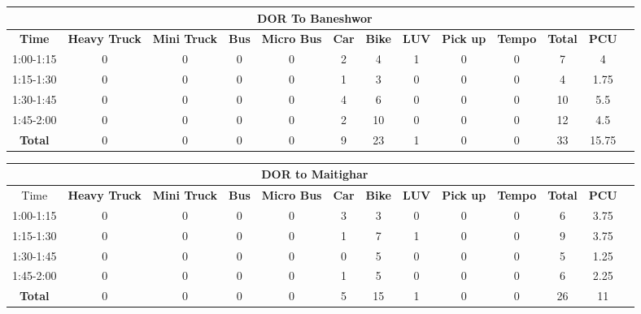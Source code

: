 \begin{landscape}
\centering
\begin{table}[h!]
\centering
\begin{tabular}{|c|c|c|c|c|c|c|c|c|c|c|c|c|}
    \hline
    \multicolumn{12}{|c|}{\textbf{DOR To Baneshwor}} \\
    \hline
    \textbf{Time} & \textbf{Heavy Truck} & \textbf{Mini Truck} & \textbf{Bus} & \textbf{Micro Bus} & \textbf{Car} & \textbf{Bike} & \textbf{LUV} & \textbf{Pick up} & \textbf{Tempo} & \textbf{\textbf{Total}} & \textbf{PCU} \\
    \hline
1:00-1:15	&0	&0	&0	&0	&2	&4	&1	&0	&0	&7	&4 \\ \hline
1:15-1:30	&0	&0	&0	&0	&1	&3	&0	&0	&0	&4	&1.75 \\ \hline
1:30-1:45	&0	&0	&0	&0	&4	&6	&0	&0	&0	&10	&5.5 \\ \hline
1:45-2:00	&0	&0	&0	&0	&2	&10	&0	&0	&0	&12	&4.5 \\ \hline
\textbf{Total}	&0	&0	&0	&0	&9	&23	&1	&0	&0	&33	&15.75 \\ \hline



\end{tabular}

\vspace{0.5cm}

\begin{tabular}{|c|c|c|c|c|c|c|c|c|c|c|c|c|}
    \hline
    \multicolumn{12}{|c|}{\textbf{DOR to Maitighar}} \\
    \hline
        Time & \textbf{Heavy Truck} & \textbf{Mini Truck} & \textbf{Bus} & \textbf{Micro Bus} & \textbf{Car} & \textbf{Bike} & \textbf{LUV} & \textbf{Pick up} & \textbf{Tempo} & \textbf{\textbf{Total}} & \textbf{PCU} \\
    \hline
1:00-1:15	&0	&0	&0	&0	&3	&3	&0	&0	&0	&6	&3.75 \\ \hline
1:15-1:30	&0	&0	&0	&0	&1	&7	&1	&0	&0	&9	&3.75 \\ \hline
1:30-1:45	&0	&0	&0	&0	&0	&5	&0	&0	&0	&5	&1.25 \\ \hline
1:45-2:00	&0	&0	&0	&0	&1	&5	&0	&0	&0	&6	&2.25 \\ \hline
\textbf{Total}	&0	&0	&0	&0	&5	&15	&1	&0	&0	&26	&11 \\ \hline


\end{tabular}


\end{table}
\end{landscape}
